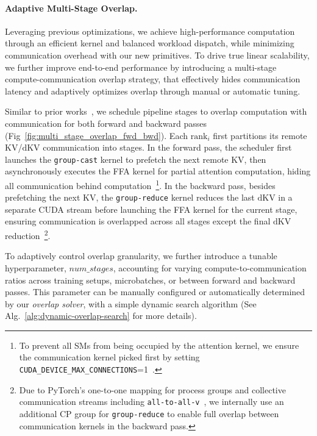 \paragraph{Adaptive Multi-Stage Overlap.}\label{sec:magiattn_overlap}



Leveraging previous optimizations, we achieve high-performance computation through an efficient kernel and balanced workload dispatch, while minimizing communication overhead with our new primitives. To drive true linear scalability, we further improve end-to-end performance by introducing a multi-stage compute-communication overlap strategy, that effectively hides communication latency and adaptively optimizes overlap through manual or automatic tuning.

Similar to prior works~\citep{liu2023ringattentionblockwisetransformers,zhao2023pytorch,async_tensor_parallelism_in_pytorch}, we schedule pipeline stages to overlap computation with communication for both forward and backward passes (Fig~\ref{fig:multi_stage_overlap_fwd_bwd}). Each $\mathrm{rank}_i$ first partitions its remote $\mathrm{KV}$/$\mathrm{dKV}$ communication into stages. 
In the forward pass, the scheduler first launches the \texttt{group-cast} kernel to prefetch the next remote $\mathrm{KV}$, then asynchronously executes the FFA kernel for partial attention computation, hiding all communication behind computation~\footnote{To prevent all SMs from being occupied by the attention kernel, we ensure the communication kernel picked first by setting \texttt{CUDA\_DEVICE\_MAX\_CONNECTIONS}=1~\citep{cuda_device_max_connections_issue}.}. 
In the backward pass, besides prefetching the next $\mathrm{KV}$, the \texttt{group-reduce} kernel reduces the last $\mathrm{dKV}$ in a separate CUDA stream before launching the FFA kernel for the current stage, ensuring communication is overlapped across all stages except the final $\mathrm{dKV}$ reduction~\footnote{Due to PyTorch's one-to-one mapping for process groups and collective communication streams including \texttt{all-to-all-v}~\citep{collectives_nccl_stream_issue}, we internally use an additional CP group for \texttt{group-reduce} to enable full overlap between communication kernels in the backward pass.}.

To adaptively control overlap granularity, we further introduce a tunable hyperparameter, $num\_stages$, accounting for varying compute-to-communication ratios across training setups, microbatches, or between forward and backward passes. This parameter can be manually configured or automatically determined by our \textit{overlap solver}, with a simple dynamic search algorithm (See Alg.~\ref{alg:dynamic-overlap-search} for more details).



















